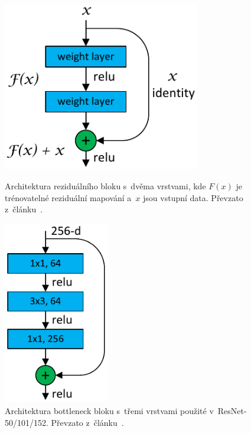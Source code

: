 \begin{figure}[hbt]
	\centering
	\setlength{\fboxsep}{0pt}
	\includegraphics[width=0.77\textwidth]{obrazky-figures/resnetBlock.pdf}
	\caption{Architektura reziduálního bloku s~dvěma vrstvami, kde $F(x)$ je trénovatelné reziduální mapování a~$x$ jsou vstupní data. Převzato z~článku~\cite{website:ResNetIntro}.}
	\label{img:ResNetBlock}
\endminipage\hfill
{}
	\centering
	\setlength{\fboxsep}{0pt}
	\includegraphics[width=0.41\textwidth]{obrazky-figures/bottleneckBlock.pdf}
	\caption{Architektura bottleneck bloku s~třemi vrstvami použité v~ResNet-50/101/152. Převzato z~článku~\cite{article:DeepResNetForImg}.}
	\label{img:ResNetBottleNeck}
\endminipage\hfill
\end{figure}

